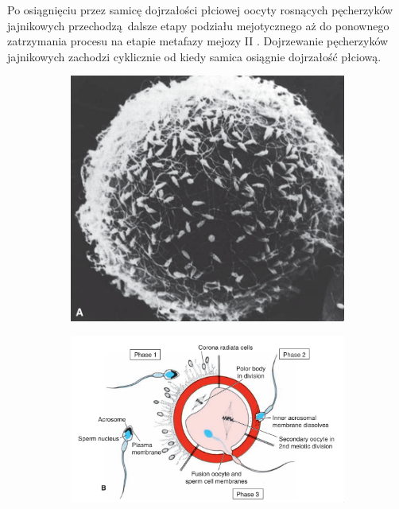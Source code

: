 \documentclass[two column, twoside, a4paper]{article}
\begin{document}
Po osiągnięciu przez samicę dojrzałości płciowej oocyty rosnących pęcherzyków jajnikowych przechodzą dalsze etapy podziału mejotycznego aż do ponownego zatrzymania procesu na etapie metafazy mejozy II \autocite{Sawicki2017}. Dojrzewanie pęcherzyków jajnikowych zachodzi cyklicznie od kiedy samica osiągnie dojrzałość płciową.

 \begin{figure}[bp]
	 \begin{tcolorbox}
		 \centering
		 \begin{subfigure}[b]{0.4\textwidth}
			 \includegraphics[width=\textwidth]{./figures/fertilization.png}
		\caption{}\label{fig::fertilization:a}
		\end{subfigure}
		 \begin{subfigure}[b]{0.5925\textwidth}
			 \includegraphics[width=\textwidth]{./figures/fertilization2.png}

\end{subfigure}
\end{tcolorbox}
\end{figure}
\end{document}
